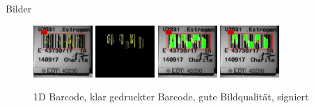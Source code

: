 \documentclass{beamer}
\begin{document}
  \begin{frame}{Bilder}
    \begin{figure}
      \includegraphics[width=0.2\textwidth]{./assets/E2017043730P1-A-17_IH-ER_0000000000000604-label_top1_positiveonlywithrest.jpg}
      \hfill
      \includegraphics[width=0.2\textwidth]{./assets/E2017043730P1-A-17_IH-ER_0000000000000604-label_top1_positiveonly.jpg}
      \hfill
      \includegraphics[width=0.2\textwidth]{./assets/E2017043730P1-A-17_IH-ER_0000000000000604-label_top1_proscons.jpg}
      \hfill
      \includegraphics[width=0.2\textwidth]{./assets/E2017043730P1-A-17_IH-ER_0000000000000604-label_top1_prosconsminweight.jpg}
      \caption{1D Barcode, klar gedruckter Barcode, gute Bildqualität, signiert}
    \end{figure}
  \end{frame}
\end{document}
